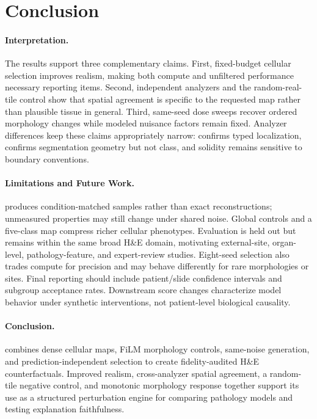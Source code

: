 \section{Conclusion}
\label{sec:discussion}

\paragraph{Interpretation.}
The results support three complementary claims. First, fixed-budget cellular selection improves realism, making both compute and unfiltered performance necessary reporting items. Second, independent analyzers and the random-real-tile control show that spatial agreement is specific to the requested map rather than plausible tissue in general. Third, same-seed dose sweeps recover ordered morphology changes while modeled nuisance factors remain fixed. Analyzer differences keep these claims appropriately narrow: \hovernet{} confirms typed localization, \stardist{} confirms segmentation geometry but not class, and solidity remains sensitive to boundary conventions.

\paragraph{Limitations and Future Work.}
\method{} produces condition-matched samples rather than exact reconstructions; unmeasured properties may still change under shared noise. Global controls and a five-class map compress richer cellular phenotypes. Evaluation is held out but remains within the same broad H\&E domain, motivating external-site, organ-level, pathology-feature, and expert-review studies. Eight-seed selection also trades compute for precision and may behave differently for rare morphologies or sites. Final reporting should include patient/slide confidence intervals and subgroup acceptance rates. Downstream score changes characterize model behavior under synthetic interventions, not patient-level biological causality.

\paragraph{Conclusion.}
\method{} combines dense cellular maps, FiLM morphology controls, same-noise generation, and prediction-independent selection to create fidelity-audited H\&E counterfactuals. Improved realism, cross-analyzer spatial agreement, a random-tile negative control, and monotonic morphology response together support its use as a structured perturbation engine for comparing pathology models and testing explanation faithfulness.
